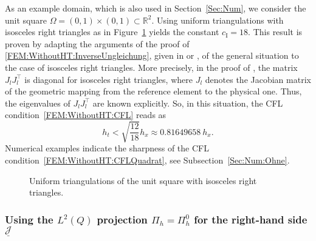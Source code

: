 \documentclass[a4paper,11pt]{article}
\newcommand{\R}{\mathbb R}
\renewcommand{\vec}[1]{\underline{#1}}
\begin{document}
As an example domain, which is also used in Section~\ref{Sec:Num}, we consider the unit square $\Omega = (0,1) \times (0,1) \subset \R^2$. Using uniform triangulations with isosceles right triangles as in Figure~\ref{FEM:WithoutHT:Fig:Quadrat} yields the constant $c_\mathrm I = 18$. This result is proven by adapting the arguments of the proof of \eqref{FEM:WithoutHT:InverseUngleichung}, given in \cite[Lemma~A.2]{HauserDiss2021} or \cite{HauserKurzSteinbach2023}, of the general situation to the case of isosceles right triangles. More precisely, in the proof of \cite[Lemma~A.2]{HauserDiss2021}, the matrix $J_l J_l^\top$ is diagonal for isosceles right triangles, where $J_l$ denotes the Jacobian matrix of the geometric mapping from the reference element to the physical one. Thus, the eigenvalues of $J_l J_l^\top$ are known explicitly. So, in this situation, the CFL condition~\eqref{FEM:WithoutHT:CFL} reads as
\begin{equation} \label{FEM:WithoutHT:CFLQuadrat}
	h_t < \sqrt{\frac{12 }{18}} h_x\approx 0.81649658\ h_x.
\end{equation}
Numerical examples indicate the sharpness of the CFL condition~\eqref{FEM:WithoutHT:CFLQuadrat}, see Subsection~\ref{Sec:Num:Ohne}.
%
\begin{figure}[ht]
	\begin{center}
		\caption{Uniform triangulations of the unit square with isosceles right triangles.}\label{FEM:WithoutHT:Fig:Quadrat}
	\end{center}
\end{figure}


\subsubsection{Using the $L^2(Q)$ projection $\Pi_h = \Pi_h^0$ for the right-hand side $\vec{\mathcal J}$} \label{Sec:FEM:WithoutHT:ProjKonst}
\end{document}
